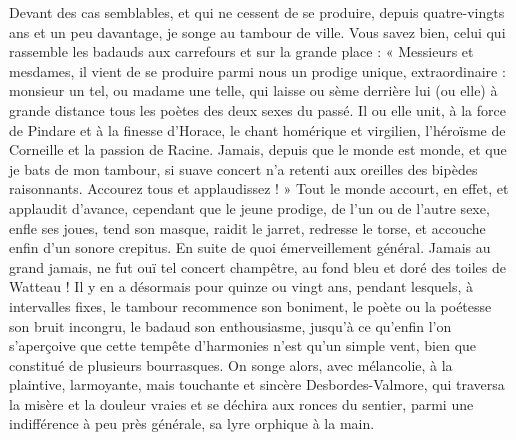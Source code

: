 \documentclass[french,twoside]{book} %
\begin{document}
Devant des cas semblables, et qui ne cessent de se produire, depuis quatre-vingts ans et un peu davantage, je songe au tambour de ville. Vous savez bien, celui qui rassemble les badauds aux carrefours et sur la grande place : « Messieurs et mesdames, il vient de se produire parmi nous un prodige unique, extraordinaire : monsieur un tel, ou madame une telle, qui laisse ou sème derrière lui (ou elle) à grande distance tous les poètes des deux sexes du passé. Il ou elle unit, à la force de Pindare et à la finesse d’Horace, le chant homérique et virgilien, l’héroïsme de Corneille et la passion de Racine. Jamais, depuis que le monde est monde, et que je bats de mon tambour, si suave concert n’a retenti aux oreilles des bipèdes raisonnants. Accourez tous et applaudissez ! » Tout le monde accourt, en effet, et applaudit d’avance, cependant que le jeune prodige, de l’un ou de l’autre sexe, enfle ses joues, tend son masque, raidit le jarret, redresse le torse, et accouche enfin d’un sonore crepitus. En suite de quoi émerveillement général. Jamais au grand jamais, ne fut ouï tel concert champêtre, au fond bleu et doré des toiles de Watteau ! Il y en a désormais pour quinze ou vingt ans, pendant lesquels, à intervalles fixes, le tambour recommence son boniment, le poète ou la poétesse son bruit incongru, le badaud son enthousiasme, jusqu’à ce qu’enfin l’on s’aperçoive que cette tempête d’harmonies n’est qu’un simple vent, bien que constitué de plusieurs bourrasques. On songe alors, avec mélancolie, à la plaintive, larmoyante, mais touchante et sincère Desbordes-Valmore, qui traversa la misère et la douleur vraies et se déchira aux ronces du sentier, parmi une indifférence à peu près générale, sa lyre orphique à la main.\par
\end{document}
